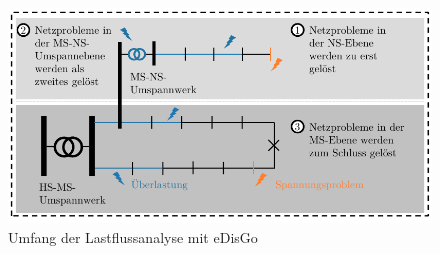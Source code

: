 \begin{figure}[H]
    \centering
    \includegraphics[width=\textwidth]{Bilder/grid_issues_scope_cropped}
    \caption{Umfang der Lastflussanalyse mit eDisGo \cite{Schachler}}\label{fig:scope}
\end{figure}